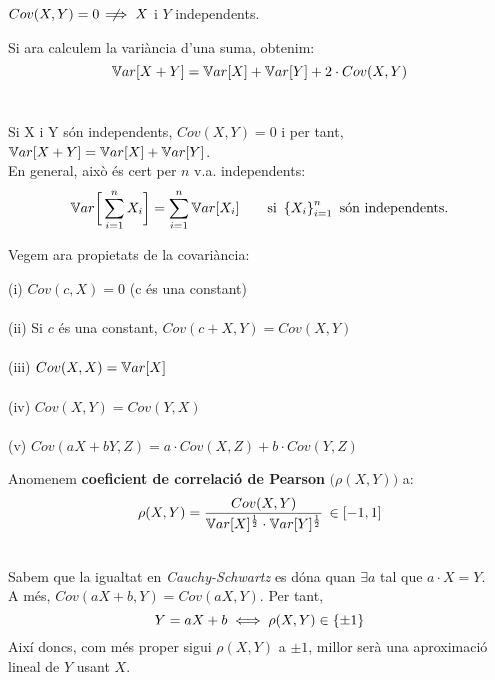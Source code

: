 \begin{obs}
  $Cov(X,Y) = 0 \hspace{0.2cm}\not\hspace{-0.25cm} \implies X$ i $Y$ independents. %
\end{obs}

Si ara calculem la variància d'una suma, obtenim: $$\mathbb{V} ar[X+Y] = \mathbb{V} ar[X] + \mathbb{V} ar[Y] + 2\cdot Cov(X,Y)$$ \\

\begin{obs}
  Si X i Y són independents, $Cov(X,Y) = 0$ i per tant, $\mathbb{V} ar[X+Y] = \mathbb{V} ar[X] + \mathbb{V} ar[Y]$. \\
  En general, això és cert per $n$ v.a. independents: 
  \[
    \mathbb{V} ar\bigg[\sum_{i=1}^{n}X_{i} \bigg] = \sum_{i=1}^{n}\mathbb{V} ar[X_{i}] \qquad \text{si } \left\{X_{i}\right\}_{i=1}^{n} \text{ són independents}.
  \]
\end{obs}

\newpage
Vegem ara propietats de la covariància:

\begin{properties}
  (i) $Cov(c, X) = 0$ (c és una constant) \\\\
  (ii) Si $c$ és una constant, $Cov(c + X,Y) = Cov(X,Y)$ \\\\
  (iii) $Cov(X,X) = \mathbb{V} ar[X]$ \\\\
  (iv) $Cov(X,Y) = Cov(Y,X)$ \\\\
  (v) $Cov(aX+bY, Z) = a\cdot Cov(X,Z) + b\cdot Cov(Y,Z)$
\end{properties}

\begin{defi}
  Anomenem \textbf{coeficient de correlació de Pearson} $\big(\rho(X,Y)\big)$ a:
  \[
    \rho(X,Y) = \frac{Cov(X,Y)}{\mathbb{V} ar[X]^{\frac{1}{2}}\cdot \mathbb{V} ar[Y]^{\frac{1}{2}}} \, \in [-1,1]
  \]
\end{defi}

\begin{obs} \- \\
  Sabem que la igualtat en \textit{Cauchy-Schwartz} es dóna quan $\exists a$ tal que $a\cdot X = Y$. \\
  A més, $Cov(aX + b, Y) = Cov(aX, Y)$. 
  Per tant, $$Y=aX + b \iff \rho(X,Y) \in \left\{\pm 1\right\}$$ Així doncs, com més proper sigui $\rho(X,Y)$ a $\pm 1$, millor serà una aproximació lineal de $Y$ usant $X$.
\end{obs}

